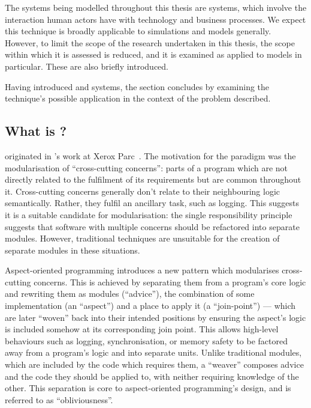 The systems being modelled throughout this thesis are \sociotechnical systems,
which involve the interaction human actors have with technology and business
processes. We expect this technique is broadly applicable to simulations and
models generally. However, to limit the scope of the research undertaken in this
thesis, the scope within which it is assessed is reduced, and it is examined as
applied to \sociotechnical models in particular. These are also briefly
introduced.

Having introduced \aop{} and \sociotechnical systems, the
section concludes by examining the technique's possible application in the
context of the problem described.





\subsection{What is \AOP{}?}

\Aop{} originated in \citeauthor{kiczales1997aspect}'s work
at Xerox Parc~\cite{kiczales1997aspect}. The motivation for the paradigm was the
modularisation of ``cross-cutting concerns'': parts of a program which are not
directly related to the fulfilment of its requirements but are common throughout
it. Cross-cutting concerns generally don't relate to their neighbouring logic
semantically. Rather, they fulfil an ancillary task, such as logging. This
suggests it is a suitable candidate for modularisation: the single
responsibility principle~\cite{martin2003singleresponsibility} suggests that
software with multiple concerns should be refactored into separate modules.
However, traditional techniques are unsuitable for the creation of separate
modules in these situations.

Aspect-oriented programming introduces a new pattern which modularises
cross-cutting concerns. This is achieved by separating them from a program's
core logic and rewriting them as modules (``advice''), the combination of some
implementation (an ``aspect'') and a place to apply it (a ``join-point'')
 --- which are later ``woven'' back into their
intended positions by ensuring the aspect's logic is included somehow at its
corresponding join point. This allows high-level behaviours such as logging,
synchronisation, or memory safety to be factored away from a program's logic and
into separate units. Unlike traditional modules, which are included by the code
which requires them, a ``weaver'' composes advice and the code they should be
applied to, with neither requiring knowledge of the other. This separation is
core to aspect-oriented programming's design, and is referred to as
``obliviousness''.

